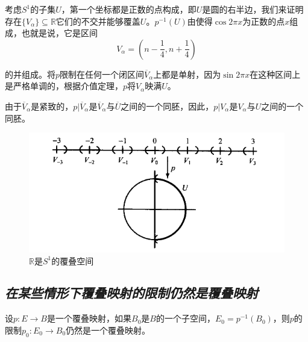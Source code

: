 \begin{mdframed}[backgroundcolor=gray!13, linewidth=0pt]
    考虑$S^1$的子集$U$，第一个坐标都是正数的点构成，即$U$是圆的右半边，我们来证明存在$\{V_\alpha\}\subseteq \mathbb{R}$它们的不交并能够覆盖$U$。$p^{-1}(U)$由使得$\cos 2\pi x$为正数的点$x$组成，也就是说，它是区间
    \begin{equation}
        V_\alpha=\left(n-\frac{1}{4},n+\frac{1}{4}\right)
    \end{equation}

    的并组成。将$p$限制在任何一个闭区间$\overline{V}_\alpha$上都是单射，因为$\sin 2\pi x$在这种区间上是严格单调的，根据介值定理，$p$将$V_\alpha$映满$U$。

    由于$\overline{V}_\alpha$是紧致的，$p|\overline{V}_\alpha$是$\overline{V}_\alpha$与$\overline{U}$之间的一个同胚，因此，$p|V_\alpha$是$V_\alpha$与$U$之间的一个同胚。
\end{mdframed}

\begin{figure}[H]
    \centering
    \includegraphics[scale=0.5]{figures/R是S的覆叠空间.png}
    \caption{$\mathbb{R}$是$S^1$的覆叠空间}
\end{figure}

\subsection*{\textsl{在某些情形下覆叠映射的限制仍然是覆叠映射}}

\begin{mdframed}
    \begin{theorem}
        设$p:E\rightarrow B$是一个覆叠映射，如果$B_0$是$B$的一个子空间，$E_0=p^{-1}(B_0)$，则$p$的限制$p_0:E_0\rightarrow B_0$仍然是一个覆叠映射。
    \end{theorem}
\end{mdframed}
\begin{example}
    
\end{example}


